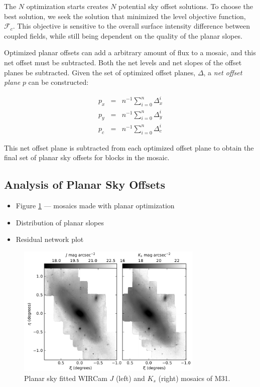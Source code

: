 \documentclass[iop]{emulateapj}
\begin{document}
The $N$ optimization starts creates $N$ potential sky offset solutions. To choose the best solution, we seek the solution that minimized the level objective function, $\mathcal{F}_c$. This objective is sensitive to the overall surface intensity difference between coupled fields, while still being dependent on the quality of the planar slopes.

Optimized planar offsets can add a arbitrary amount of flux to a mosaic, and this net offset must be subtracted. Both the net levels and net slopes of the offset planes be subtracted. Given the set of optimized offset planes, $\Delta$, a \emph{net offset plane} $p$ can be constructed:

\begin{eqnarray}
	p_x & = & n^{-1} \sum_{i=0}^n \Delta_x^i \\
	p_y & = & n^{-1} \sum_{i=0}^n \Delta_y^i \\
	p_c & = & n^{-1} \sum_{i=0}^n \Delta_c^i
\end{eqnarray}

\noindent This net offset plane is subtracted from each optimized offset plane to obtain the final set of planar sky offsets for blocks in the mosaic.

\subsection{Analysis of Planar Sky Offsets}

\begin{itemize}
	\item Figure \ref{fig:planar_mosaics} --- mosaics made with planar optimization
	\item Distribution of planar slopes
	\item Residual network plot
\end{itemize}

\begin{figure}[t]
	\centering
		\includegraphics[width=3.5in]{figs/planar_mosaics}
	\caption{Planar sky fitted WIRCam $J$ (left) and $K_s$ (right) mosaics of M31.}
	\label{fig:planar_mosaics}
\end{figure}
\end{document}
